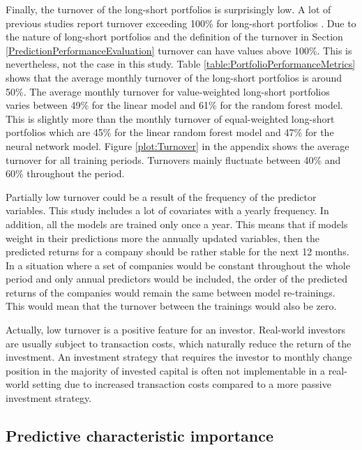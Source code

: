 \documentclass[12pt]{article}
\begin{document}
Finally, the turnover of the long-short portfolios is surprisingly low. A lot of previous studies report turnover exceeding 100\% for long-short portfolios \citep[e.g.][]{guetal, TOBEK2021100588}. Due to the nature of long-short portfolios and the definition of the turnover in Section \ref{PredictionPerformanceEvaluation} turnover can have values above 100\%. This is nevertheless, not the case in this study. Table \ref{table:PortfolioPerformanceMetrics} shows that the average monthly turnover of the long-short portfolios is around 50\%. The average monthly turnover for value-weighted long-short portfolios varies between 49\% for the linear model and 61\% for the random forest model. This is slightly more than the monthly turnover of equal-weighted long-short portfolios which are 45\% for the linear random forest model and 47\% for the neural network model. Figure \ref{plot:Turnover} in the appendix shows the average turnover for all training periods. Turnovers mainly fluctuate between 40\% and 60\% throughout the period. \par

Partially low turnover could be a result of the frequency of the predictor variables. This study includes a lot of covariates with a yearly frequency. In addition, all the models are trained only once a year. This means that if models weight in their predictions more the annually updated variables, then the predicted returns for a company should be rather stable for the next 12 months. In a situation where a set of companies would be constant throughout the whole period and only annual predictors would be included, the order of the predicted returns of the companies would remain the same between model re-trainings. This would mean that the turnover between the trainings would also be zero. \par

Actually, low turnover is a positive feature for an investor. Real-world investors are usually subject to transaction costs, which naturally reduce the return of the investment. An investment strategy that requires the investor to monthly change position in the majority of invested capital is often not implementable in a real-world setting due to increased transaction costs compared to a more passive investment strategy. \par

\subsection{Predictive characteristic importance}\label{PredictiveCharacteristicImportance}
\end{document}
